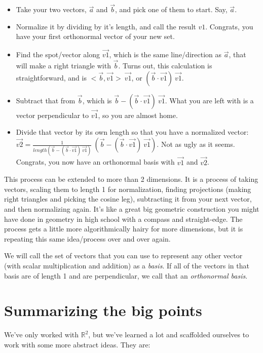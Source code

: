 \documentclass[
]{book}
\providecommand{\tightlist}{%
  \setlength{\itemsep}{0pt}\setlength{\parskip}{0pt}}
\begin{document}
\begin{itemize}
\tightlist
\item
  Take your two vectors, \(\vec{a}\) and \(\vec{b}\), and pick one of them to start. Say, \(\vec{a}\).
\item
  Normalize it by dividing by it's length, and call the result \(v1\). Congrats, you have your first orthonormal vector of your new set.
\item
  Find the spot/vector along \(\vec{v1}\), which is the same line/direction as \(\vec{a}\), that will make a right triangle with \(\vec{b}\). Turns out, this calculation is straightforward, and is \(<\vec{b},\vec{v1}>\ \vec{v1}\), or \((\vec{b}\cdot\vec{v1})\ \vec{v1}\).
\item
  Subtract that from \(\vec{b}\), which is \(\vec{b} - (\vec{b}\cdot\vec{v1})\ \vec{v1}\). What you are left with is a vector perpendicular to \(\vec{v1}\), so you are almost home.
\item
  Divide that vector by its own length so that you have a normalized vector: \(\vec{v2} = \frac{1}{length(\vec{b} - (\vec{b}\cdot\vec{v1})\ \vec{v1})}\ (\vec{b} - (\vec{b}\cdot\vec{v1})\ \vec{v1})\). Not as ugly as it seems. Congrats, you now have an orthonormal basis with \(\vec{v1}\) and \(\vec{v2}\).
\end{itemize}

This process can be extended to more than 2 dimensions. It is a process of taking vectors, scaling them to length 1 for normalization, finding projections (making right triangles and picking the cosine leg), subtracting it from your next vector, and then normalizing again. It's like a great big geometric construction you might have done in geometry in high school with a compass and straight-edge. The process gets a little more algorithmically hairy for more dimensions, but it is repeating this same idea/process over and over again.

We will call the set of vectors that you can use to represent any other vector (with scalar multiplication and addition) as a \emph{basis}. If all of the vectors in that basis are of length 1 and are perpendicular, we call that an \emph{orthonormal basis}.

\hypertarget{summarizing-the-big-points}{%
\section{Summarizing the big points}\label{summarizing-the-big-points}}

We've only worked with \(\mathbb{R}^2\), but we've learned a lot and scaffolded ourselves to work with some more abstract ideas. They are:
\end{document}
